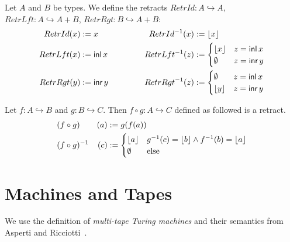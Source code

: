 \begin{definition}
  \label{def:retracts-basic}
  Let $A$ and $B$ be types.  We define the retracts $RetrId : A \hookrightarrow A$, $RetrLft : A \hookrightarrow A+B$, $RetrRgt : B \hookrightarrow A+B$:
  \begin{alignat*}{2}
    RetrId(x)  &:= x      &\qquad\qquad RetrId ^{-1} (x) &:= \left\lfloor {x} \right\rfloor \\
    RetrLft(x) &:= \operatorname{\textsf{inl}} x &             RetrLft^{-1} (z) &:=
    \begin{cases}
      \left\lfloor {x} \right\rfloor & z = \operatorname{\textsf{inl}} x \\
      \emptyset   & z = \operatorname{\textsf{inr}} y
    \end{cases} \\
    RetrRgt(y) &:= \operatorname{\textsf{inr}} y & RetrRgt^{-1} (z) &:=
    \begin{cases}
      \emptyset   & z = \operatorname{\textsf{inl}} x \\
      \left\lfloor {y} \right\rfloor & z = \operatorname{\textsf{inr}} y
    \end{cases}
  \end{alignat*}
\end{definition}

\begin{definition}
  \label{def:retract-compose}
  Let $f : A \hookrightarrow B$ and $g : B \hookrightarrow C$.  Then $f \circ g : A \hookrightarrow C$ defined as followed is a retract.
  \begin{alignat*}{2}
    & (f \circ g)      & (a) &:= g(f(a)) \\
    & (f \circ g)^{-1} & (c) &:=
                          \begin{cases}
                            \left\lfloor {a} \right\rfloor & g^{-1}(c) = \left\lfloor {b} \right\rfloor \land f^{-1}(b) = \left\lfloor {a} \right\rfloor \\
                            \emptyset   & \text{else}
                          \end{cases}
  \end{alignat*}
\end{definition}







\section{Machines and Tapes}
\label{sec:machine-tapes}

We use the definition of \emph{multi-tape Turing machines} and their semantics from Asperti and Ricciotti~\cite{asperti2015}.


